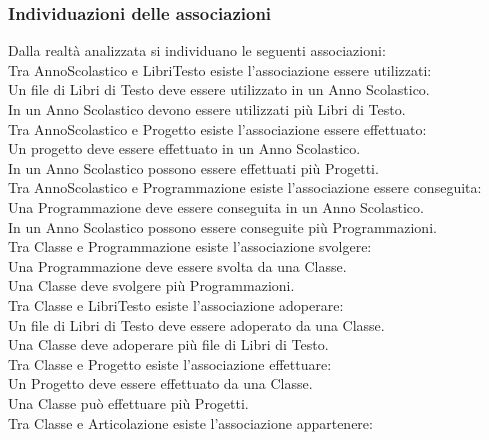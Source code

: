 \documentclass{article}
\begin{document}
	\subsubsection{\textbf{Individuazioni delle associazioni}}
	Dalla realtà analizzata si individuano le seguenti associazioni:\\
	Tra AnnoScolastico e LibriTesto esiste l’associazione essere utilizzati:\\
	Un file di Libri di Testo deve essere utilizzato in un Anno Scolastico.\\
	In un Anno Scolastico devono essere utilizzati più Libri di Testo.\\
	\vspace{2mm}
	Tra AnnoScolastico e Progetto esiste l’associazione essere effettuato:\\
	Un progetto deve essere effettuato in un Anno Scolastico.\\
	In un Anno Scolastico possono essere effettuati più Progetti.\\
	\vspace{2mm}
	Tra AnnoScolastico e Programmazione esiste l’associazione essere conseguita:\\
	Una Programmazione deve essere conseguita in un Anno Scolastico.\\
	In un Anno Scolastico possono essere conseguite più Programmazioni.\\
	\vspace{2mm}
	Tra Classe e Programmazione esiste l’associazione svolgere:\\
	Una Programmazione deve essere svolta da una Classe.\\
	Una Classe deve svolgere più Programmazioni.\\
	\vspace{2mm}
	Tra Classe e LibriTesto esiste l’associazione adoperare:\\
	Un file di Libri di Testo deve essere adoperato da una Classe.\\
	Una Classe deve adoperare più file di Libri di Testo.\\
	\vspace{2mm}
	Tra Classe e Progetto esiste l’associazione effettuare:\\
	Un Progetto deve essere effettuato da una Classe.\\
	Una Classe può effettuare più Progetti.\\
	\vspace{2mm}
	Tra Classe e Articolazione esiste l’associazione appartenere:\\
\end{document}
